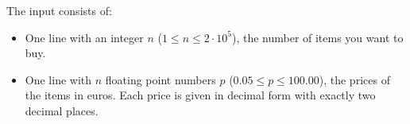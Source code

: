 
    The input consists of:
    \begin{itemize}
        \item One line with an integer $n$ ($1 \leq n \leq 2 \cdot 10^5$),
            the number of items you want to buy.
        \item One line with $n$ floating point numbers $p$ ($0.05 \leq p \leq 100.00$), the prices of the items in euros.
            Each price is given in decimal form\footnotemark[1]{} with exactly two decimal places.
    \end{itemize}
